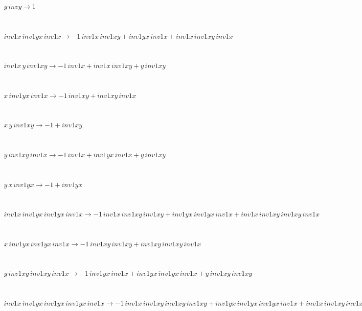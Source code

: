 \begin{minipage}{6in}
$
y\,
 invy\rightarrow 1
$
\end{minipage}\medskip \\
\begin{minipage}{6in}
$
inv1x\,
 inv1yx\,
 inv1x\rightarrow -1\,
 inv1x\,
 inv1xy + inv1yx\,
 inv1x + inv1x\,
 inv1xy\,
 inv1x
$
\end{minipage}\medskip \\
\begin{minipage}{6in}
$
inv1x\,
 y\,
 inv1xy\rightarrow -1\,
 inv1x + inv1x\,
 inv1xy + y\,
 inv1xy
$
\end{minipage}\medskip \\
\begin{minipage}{6in}
$
x\,
 inv1yx\,
 inv1x\rightarrow -1\,
 inv1xy + inv1xy\,
 inv1x
$
\end{minipage}\medskip \\
\begin{minipage}{6in}
$
x\,
 y\,
 inv1xy\rightarrow -1 + inv1xy
$
\end{minipage}\medskip \\
\begin{minipage}{6in}
$
y\,
 inv1xy\,
 inv1x\rightarrow -1\,
 inv1x + inv1yx\,
 inv1x + y\,
 inv1xy
$
\end{minipage}\medskip \\
\begin{minipage}{6in}
$
y\,
 x\,
 inv1yx\rightarrow -1 + inv1yx
$
\end{minipage}\medskip \\
\begin{minipage}{6in}
$
inv1x\,
 inv1yx\,
 inv1yx\,
 inv1x\rightarrow -1\,
 inv1x\,
 inv1xy\,
 inv1xy + inv1yx\,
 inv1yx\,
 inv1x + inv1x\,
 inv1xy\,
 inv1xy\,
 inv1x
$
\end{minipage}\medskip \\
\begin{minipage}{6in}
$
x\,
 inv1yx\,
 inv1yx\,
 inv1x\rightarrow -1\,
 inv1xy\,
 inv1xy + inv1xy\,
 inv1xy\,
 inv1x
$
\end{minipage}\medskip \\
\begin{minipage}{6in}
$
y\,
 inv1xy\,
 inv1xy\,
 inv1x\rightarrow -1\,
 inv1yx\,
 inv1x + inv1yx\,
 inv1yx\,
 inv1x + y\,
 inv1xy\,
 inv1xy
$
\end{minipage}\medskip \\
\begin{minipage}{6in}
$
inv1x\,
 inv1yx\,
 inv1yx\,
 inv1yx\,
 inv1x\rightarrow -1\,
 inv1x\,
 inv1xy\,
 inv1xy\,
 inv1xy + inv1yx\,
 inv1yx\,
 inv1yx\,
 inv1x + inv1x\,
 inv1xy\,
 inv1xy\,
 inv1xy\,
 inv1x
$
\end{minipage}\medskip \\
